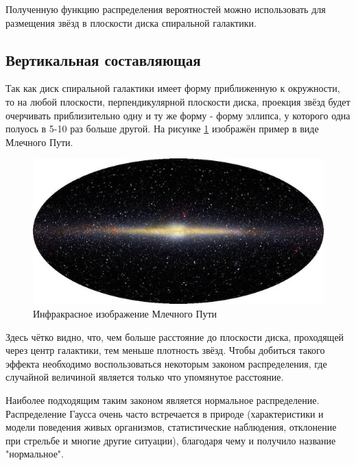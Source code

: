 Полученную функцию распределения вероятностей можно использовать для размещения звёзд в плоскости диска спиральной галактики.

\subsection{Вертикальная составляющая}

Так как диск спиральной галактики имеет форму приближенную к окружности, то на любой плоскости, перпендикулярной плоскости диска, проекция звёзд будет очерчивать приблизительно одну и ту же форму - форму эллипса, у которого одна полуось в 5-10 раз больше другой. На рисунке \ref{img:miklyway} изображён пример в виде Млечного Пути.

\begin{figure}[H]
    \centering
	\includegraphics[scale=0.4]{image/MilkyWay.jpg}
	\caption{Инфракрасное изображение Млечного Пути}
	\label{img:miklyway}
\end{figure}
Здесь чётко видно, что, чем больше расстояние до плоскости диска, проходящей через центр галактики, тем меньше плотность звёзд. Чтобы добиться такого эффекта необходимо воспользоваться некоторым законом распределения, где случайной величиной является только что упомянутое расстояние.

Наиболее подходящим таким законом является нормальное распределение. Распределение Гаусса очень часто встречается в природе (характеристики и модели поведения живых организмов, статистические наблюдения, отклонение при стрельбе и многие другие ситуации), благодаря чему и получило название "нормальное".

